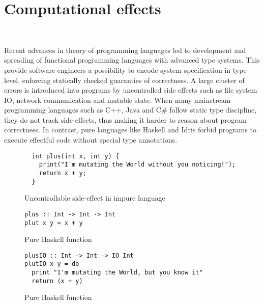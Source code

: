 \chapter{Computational effects}
~\label{cpt-effects}


  Recent advances in theory of programming languages led to development and spreading
  of functional programming languages with advanced type systems. This provide
  software engineers a possibility to encode system specification in type-level, enforcing statically checked guaranties of correctness. A large cluster of errors is
  introduced into programs by uncontrolled side effects such as file system IO,
  network communication and mutable state. When many mainstream programming languages such as C++, Java and C\# follow static type discipline, they do not track
  side-effects, thus making it harder to reason about program correctness. In contrast,
  pure languages like Haskell and Idris forbid programs to execute effectful code
  without special type annotations.

  \begin{figure}[h]
  \begin {lstlisting}
  int plus(int x, int y) {
    print("I'm mutating the World without you noticing!");
    return x + y;
  }
  \end{lstlisting}
  \caption{Uncontrollable side-effect in impure language}
  \label{listing:effectfulPlus}
  \end{figure}

  \begin{figure}[h]
  \begin{lstlisting}
plus :: Int -> Int -> Int
plut x y = x + y
  \end{lstlisting}
  \caption{Pure Haskell function}
  \label{listing:purePlusHaskell}
  \end{figure}

  \begin{figure}[h]
  \begin{lstlisting}
plusIO :: Int -> Int -> IO Int
plutIO x y = do
  print "I'm mutating the World, but you know it"
  return (x + y)
  \end{lstlisting}
  \caption{Pure Haskell function}
  \label{listing:purePlusHaskell}
  \end{figure}

